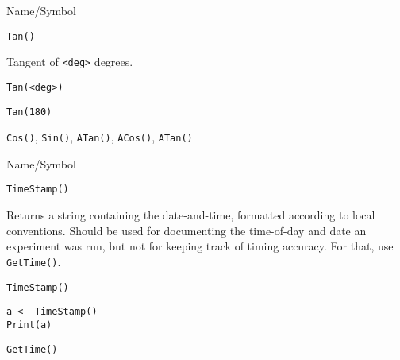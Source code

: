 \begin{desc}{Name/Symbol}
\item[Name/Symbol]  	\verb+Tan()+	

\item[Description] 	Tangent of \verb+<deg>+ degrees.

\item[Usage]       	
\begin{verbatim}
Tan(<deg>)
\end{verbatim}

\item[Example]
\begin{verbatim}
Tan(180)
\end{verbatim}

\item[See Also]    	\verb+Cos()+, \verb+Sin()+, \verb+ATan()+, \verb+ACos()+, \verb+ATan()+ 
\end{desc}

\rl


\begin{desc}{Name/Symbol}
\item[Name/Symbol]  	\verb+TimeStamp()+

\item[Description] Returns a string containing the date-and-time,
  formatted according to local conventions. Should be used for
  documenting the time-of-day and date an experiment was run, but not
  for keeping track of timing accuracy.  For that, use
  \verb+GetTime()+.
	     
\item[Usage]
\begin{verbatim}
TimeStamp()
\end{verbatim}

\item[Example]
\begin{verbatim}
a <- TimeStamp()
Print(a)
\end{verbatim}

\item[See Also]     	\verb+GetTime()+
\end{desc}

\rl


